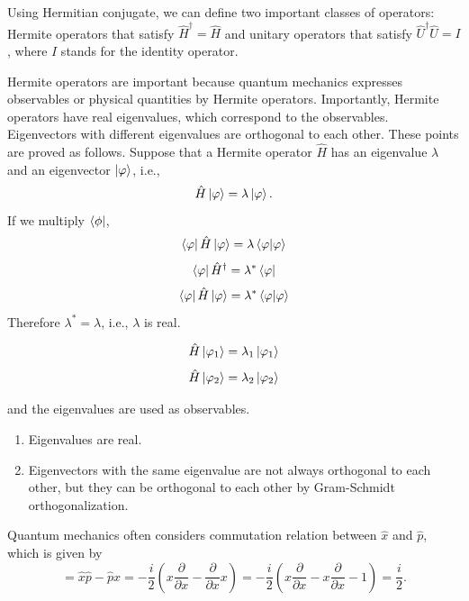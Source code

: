 \documentclass{book}
\begin{document}
Using Hermitian conjugate, we can define two important classes of operators: Hermite operators that satisfy $\hat H^\dagger = \hat H$ and unitary operators that satisfy $\hat U^\dagger \hat U = I$, where $I$ stands for the identity operator.

Hermite operators are important because quantum mechanics expresses observables or physical quantities by Hermite operators. Importantly, Hermite operators have real eigenvalues, which correspond to the observables. Eigenvectors with different eigenvalues are orthogonal to each other. These points are proved as follows. Suppose that a Hermite operator $\hat H$ has an eigenvalue $\lambda$ and an eigenvector $\ket \varphi$, i.e.,
\begin{equation}
  \hat H\ket \varphi = \lambda \ket \varphi.
\end{equation}
If we multiply $\bra \phi$,
\begin{equation}
  \bra \varphi \hat H \ket \varphi = \lambda \braket{\varphi|\varphi}
\end{equation}
\begin{equation}
  \bra \varphi \hat H^\dagger = \lambda^* \bra \varphi
\end{equation}
\begin{equation}
  \bra\varphi \hat H \ket \varphi = \lambda^*\braket{\varphi|\varphi}
\end{equation}
Therefore $\lambda^* = \lambda$, i.e., $\lambda$ is real.

\begin{equation}
  \hat H \ket {\varphi_1} = \lambda_1\ket {\varphi_1}
\end{equation}
\begin{equation}
  \hat H \ket {\varphi_2} = \lambda_2\ket {\varphi_2}
\end{equation}

and the eigenvalues are used as observables.
\begin{enumerate}
	\item Eigenvalues are real.
	\item Eigenvectors with the same eigenvalue are not always orthogonal to each other, but they can be orthogonal to each other by Gram-Schmidt orthogonalization.
\end{enumerate}


Quantum mechanics often considers commutation relation between $\hat x$ and $\hat p$, which is given by 
\begin{equation}
  [\hat x, \hat p] = \hat x\hat p- \hat p \hat x = -\frac{i}{2}\left(x\frac{\partial}{\partial x} -  \frac{\partial}{\partial x}x\right) = -\frac{i}{2}\left(x\frac{\partial}{\partial x} -  x\frac{\partial}{\partial x} - 1\right) = \frac i 2.
  \label{eq:commutation_x_p}
\end{equation}
\end{document}

